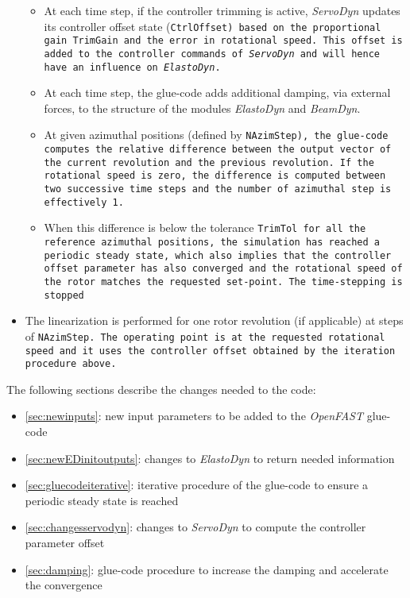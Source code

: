 \documentclass[11pt]{article}
\begin{document}
\begin{itemize}
\begin{itemize}
    \item At each time step, if the controller trimming is active, \textit{ServoDyn} updates its controller offset state (\tt{CtrlOffset}) based on the proportional gain \tt{TrimGain} and the error in rotational speed. This offset is added to the controller commands of \textit{ServoDyn} and will hence have an influence on \textit{ElastoDyn}. 
    \item At each time step, the glue-code adds additional damping, via external forces, to the structure of the modules \textit{ElastoDyn} and \textit{BeamDyn}.
    \item At given azimuthal positions (defined by \tt{NAzimStep}), the glue-code computes the relative difference between the output vector of the current revolution and the previous revolution. If the rotational speed is zero, the difference is computed between two successive time steps and the number of azimuthal step is effectively 1.
    \item When this difference is below the tolerance \tt{TrimTol} for all the reference azimuthal positions, the simulation has reached a periodic steady state, which also implies that the controller offset parameter has also converged and the rotational speed of the rotor matches the requested set-point. The time-stepping is stopped
    \end{itemize}
    \item  The linearization is performed for one rotor revolution (if applicable) at steps of \tt{NAzimStep}. The operating point is at the requested rotational speed and it uses the controller offset obtained by the iteration procedure above.
\end{itemize}


The following sections describe the changes needed to the code:
\begin{itemize}
    \item \autoref{sec:newinputs}: new input parameters to be added to the \textit{OpenFAST} glue-code
    \item \autoref{sec:newEDinitoutputs}: changes to \textit{ElastoDyn} to return needed information
    \item \autoref{sec:gluecodeiterative}: iterative procedure of the glue-code to ensure a periodic steady state is reached
    \item \autoref{sec:changesservodyn}: changes to \textit{ServoDyn} to compute the controller parameter offset
    \item \autoref{sec:damping}: glue-code procedure to increase the damping and accelerate the convergence
\end{itemize}
\end{document}
